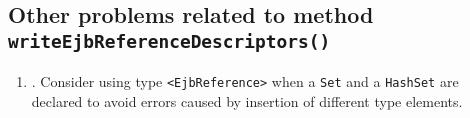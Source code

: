 \subsection{Other problems related to method \texttt{writeEjbReferenceDescriptors()}}
\begin{enumerate}
\item {}. Consider using type \texttt{<EjbReference>}  when a \texttt{Set} and a \texttt{HashSet} are declared to avoid errors caused by insertion of different type elements.
\end{enumerate}